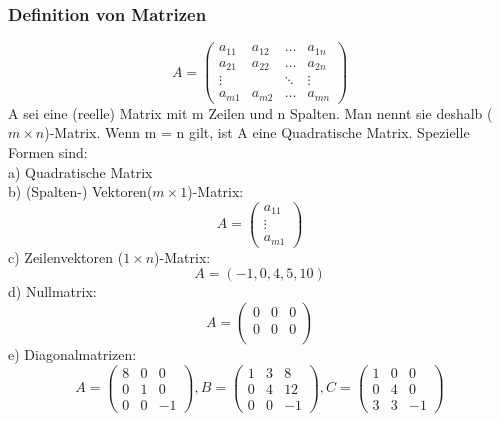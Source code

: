 \documentclass[10pt]{scrartcl}
\begin{document}
\begin{multicols}{2}
\subsubsection*{Definition von Matrizen}
\begin{equation}
A = \begin{pmatrix}
a_{11} & a_{12} & \dots & a_{1n}\\
a_{21} & a_{22} & \dots & a_{2n}\\
\vdots & & \ddots & \vdots\\
a_{m1} & a_{m2} & \dots & a_{mn}
\end{pmatrix}
\end{equation}
A sei eine (reelle) Matrix mit m Zeilen und n Spalten. Man nennt sie deshalb ($m \times n$)-Matrix. Wenn m = n gilt, ist A eine Quadratische Matrix. Spezielle Formen sind:\\
a) Quadratische Matrix\\
b) (Spalten-) Vektoren($m \times 1$)-Matrix:
\begin{equation}
A= \begin{pmatrix}
a_{11}\\
\vdots\\
a_{m1}
\end{pmatrix}
\end{equation}
c) Zeilenvektoren ($1 \times n$)-Matrix:
\begin{equation}
A= \left(-1,0,4,5,10\right) 
\end{equation}
d) Nullmatrix:
\begin{equation}
A= \begin{pmatrix}
0 & 0 & 0\\
0 & 0 & 0 \\
\end{pmatrix}
\end{equation}
e) Diagonalmatrizen:
\begin{equation}
A= \begin{pmatrix}
8 & 0 & 0\\
0 & 1 & 0 \\
0 & 0 & -1
\end{pmatrix}, B= \begin{pmatrix}
1 & 3 & 8\\
0 & 4 & 12 \\
0 & 0 & -1
\end{pmatrix}, C= \begin{pmatrix}
1 & 0 & 0\\
0 & 4 & 0 \\
3 & 3 & -1
\end{pmatrix}

\end{equation}
\end{multicols}
\end{document}
